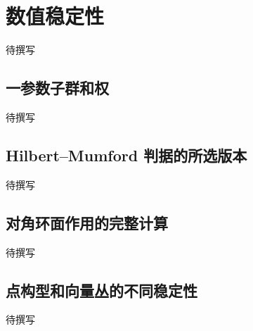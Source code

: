 
% 
% 

\section{数值稳定性}
\label{g5:sec:3403}

待撰写

\subsection{一参数子群和权}
\label{g5:subsec:3403:01}
待撰写

\subsection{Hilbert–Mumford 判据的所选版本}
\label{g5:subsec:3403:02}
待撰写

\subsection{对角环面作用的完整计算}
\label{g5:subsec:3403:03}
待撰写

\subsection{点构型和向量丛的不同稳定性}
\label{g5:subsec:3403:04}
待撰写
